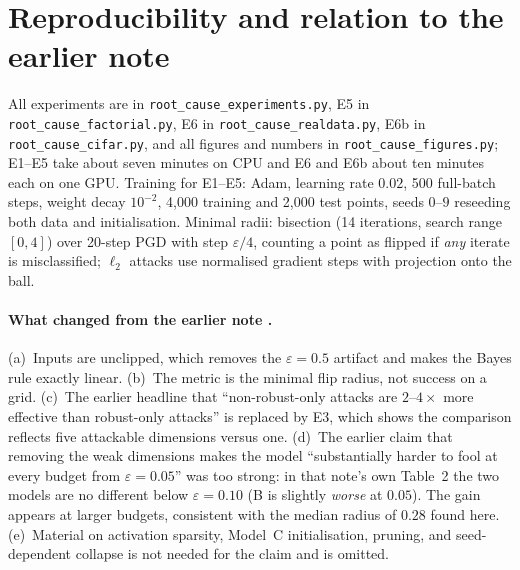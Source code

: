 \documentclass[11pt]{article}
\newcommand{\ltwo}{\ell_2}
\begin{document}
\appendix
\section{Reproducibility and relation to the earlier note}

All experiments are in \texttt{root\_cause\_experiments.py}, E5 in \texttt{root\_cause\_factorial.py}, E6 in \texttt{root\_cause\_realdata.py}, E6b in \texttt{root\_cause\_cifar.py}, and all figures and
numbers in \texttt{root\_cause\_figures.py}; E1--E5 take about seven minutes
on CPU and E6 and E6b about ten minutes each on one GPU. Training for E1--E5: Adam, learning rate $0.02$, 500 full-batch steps, weight decay
$10^{-2}$, 4{,}000 training and 2{,}000 test points, seeds $0$--$9$ reseeding
both data and initialisation. Minimal radii: bisection (14 iterations, search
range $[0,4]$) over 20-step PGD with step $\varepsilon/4$, counting a point as
flipped if \emph{any} iterate is misclassified; $\ltwo$ attacks use normalised
gradient steps with projection onto the ball.

\paragraph{What changed from the earlier note \cite{earlier}.}
(a)~Inputs are unclipped, which removes the $\varepsilon=0.5$ artifact and
makes the Bayes rule exactly linear. (b)~The metric is the minimal flip radius,
not success on a grid. (c)~The earlier headline that ``non-robust-only attacks
are $2$--$4\times$ more effective than robust-only attacks'' is replaced by
E3, which shows the comparison reflects five attackable dimensions versus
one. (d)~The earlier claim that removing the weak dimensions makes the model
``substantially harder to fool at every budget from $\varepsilon=0.05$'' was
too strong: in that note's own Table~2 the two models are no different below
$\varepsilon=0.10$ (B is slightly \emph{worse} at $0.05$). The gain appears at
larger budgets, consistent with the median radius of $0.28$ found here. (e)~Material
on activation sparsity, Model~C initialisation, pruning, and seed-dependent
collapse is not needed for the claim and is omitted.
\end{document}
